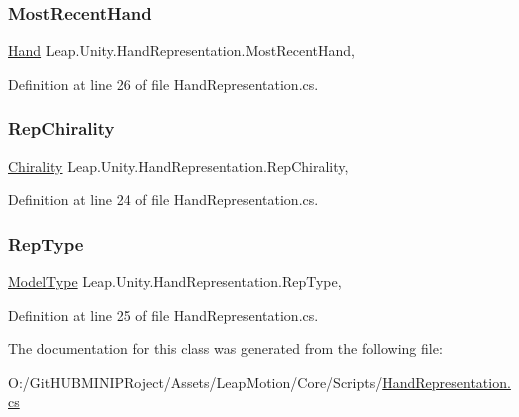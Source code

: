 \subsubsection{\texorpdfstring{MostRecentHand}{MostRecentHand}}
{\footnotesize\ttfamily \mbox{\hyperlink{class_leap_1_1_hand}{Hand}} Leap.\+Unity.\+Hand\+Representation.\+Most\+Recent\+Hand\hspace{0.3cm}{\ttfamily [get]}, {}}



Definition at line 26 of file Hand\+Representation.\+cs.

\mbox{\label{class_leap_1_1_unity_1_1_hand_representation_a732f287fb1b792434c81e670b8b1df0c}} 
\subsubsection{\texorpdfstring{RepChirality}{RepChirality}}
{\footnotesize\ttfamily \mbox{\hyperlink{namespace_leap_1_1_unity_a4d15adcf20ba121b2cd9c07f503b606f}{Chirality}} Leap.\+Unity.\+Hand\+Representation.\+Rep\+Chirality\hspace{0.3cm}{\ttfamily [get]}, {}}



Definition at line 24 of file Hand\+Representation.\+cs.

\mbox{\label{class_leap_1_1_unity_1_1_hand_representation_ae3de3baa219e6100022a6e606b5f9cc1}} 
\subsubsection{\texorpdfstring{RepType}{RepType}}
{\footnotesize\ttfamily \mbox{\hyperlink{namespace_leap_1_1_unity_a186e5eb0a2b743f1f6b79346f0ab8ad0}{Model\+Type}} Leap.\+Unity.\+Hand\+Representation.\+Rep\+Type\hspace{0.3cm}{\ttfamily [get]}, {}}



Definition at line 25 of file Hand\+Representation.\+cs.



The documentation for this class was generated from the following file\+:\begin{DoxyCompactItemize}
\item 
O\+:/\+Git\+H\+U\+B\+M\+I\+N\+I\+P\+Roject/\+Assets/\+Leap\+Motion/\+Core/\+Scripts/\mbox{\hyperlink{_hand_representation_8cs}{Hand\+Representation.\+cs}}\end{DoxyCompactItemize}
